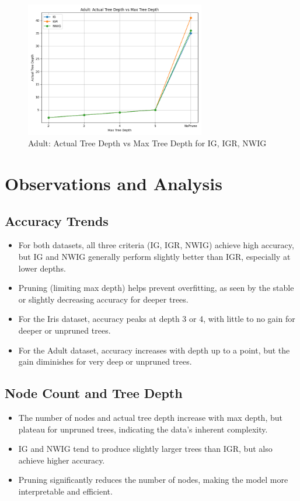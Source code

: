 \documentclass{article}
\begin{document}
\begin{figure}[h!]
    \centering
    \includegraphics[width=0.7\textwidth]{graphs/Adult_actualDepth_vs_maxDepth.png}
    \caption{Adult: Actual Tree Depth vs Max Tree Depth for IG, IGR, NWIG}
\end{figure}

\clearpage

\section{Observations and Analysis}

\subsection{Accuracy Trends}
\begin{itemize}
    \item For both datasets, all three criteria (IG, IGR, NWIG) achieve high accuracy, but IG and NWIG generally perform slightly better than IGR, especially at lower depths.
    \item Pruning (limiting max depth) helps prevent overfitting, as seen by the stable or slightly decreasing accuracy for deeper trees.
    \item For the Iris dataset, accuracy peaks at depth 3 or 4, with little to no gain for deeper or unpruned trees.
    \item For the Adult dataset, accuracy increases with depth up to a point, but the gain diminishes for very deep or unpruned trees.
\end{itemize}

\subsection{Node Count and Tree Depth}
\begin{itemize}
    \item The number of nodes and actual tree depth increase with max depth, but plateau for unpruned trees, indicating the data's inherent complexity.
    \item IG and NWIG tend to produce slightly larger trees than IGR, but also achieve higher accuracy.
    \item Pruning significantly reduces the number of nodes, making the model more interpretable and efficient.
\end{itemize}
\end{document}
